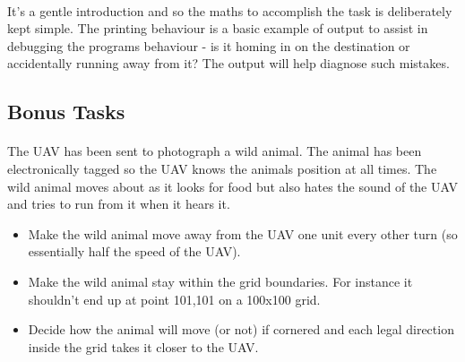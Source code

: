 \documentclass[11pt]{book}
\begin{document}
\paragraph{} It's a gentle introduction and so the maths to accomplish the
task is deliberately kept simple. The printing behaviour is a basic example of
output to assist in debugging the programs behaviour - is it homing in on the
destination or accidentally running away from it? The output will help
diagnose such mistakes.

\subsection{Bonus Tasks}

\paragraph{} The UAV has been sent to photograph a wild animal. The animal has
been electronically tagged so the UAV knows the animals position at all times.
The wild animal moves about as it looks for food but also hates the sound of
the UAV and tries to run from it when it hears it.

\begin{itemize}
\item Make the wild animal move away from the UAV one unit every other turn (so essentially half the speed of the UAV).
\item Make the wild animal stay within the grid boundaries. For instance it shouldn't end up at point 101,101 on a 100x100 grid.
\item Decide how the animal will move (or not) if cornered and each legal direction inside the grid takes it closer to the UAV.
\end{itemize}

\clearpage
\end{document}
